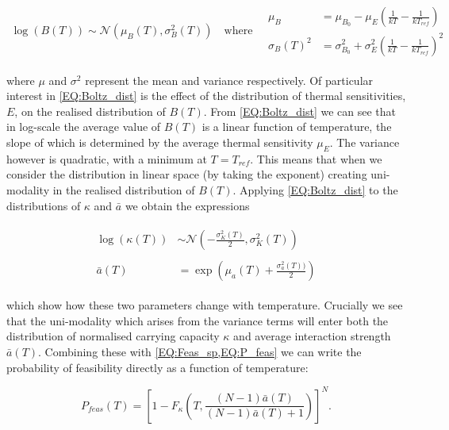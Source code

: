 \documentclass{article}
\begin{document}
\begin{align} \label{EQ:Boltz_dist}
    \log(B(T)) \sim \mathcal{N}\left(\mu_{B}(T) , \sigma_{B}^2(T) \right) 
    \quad \text{where} \quad
    \begin{array}{cc}
        \mu_B &= \mu_{B_0} - \mu_{E} \left(\frac{1}{kT} - \frac{1}{k T_{ref} }\right)  \\
        \sigma_{B}(T)^2 &= \sigma_{B_0}^2 + \sigma_{E}^2 \left(\frac{1}{kT} - \frac{1}{k T_{ref} }\right)^2
    \end{array}
\end{align}

where $\mu$ and $\sigma^2$ represent the mean and variance respectively. Of particular interest in \cref{EQ:Boltz_dist} is the effect of the distribution of thermal sensitivities, $E$, on the realised distribution of $B(T)$. From \cref{EQ:Boltz_dist} we can see that in log-scale the average value of $B(T)$ is a linear function of temperature, the slope of which is determined by the average thermal sensitivity $\mu_E$. The variance however is quadratic, with a minimum at $T = T_{ref}$. This means that when we consider the distribution in linear space (by taking the exponent)  creating uni-modality in the realised distribution of $B(T)$. Applying \cref{EQ:Boltz_dist} to the distributions of $\kappa$ and $\bar{a}$ we obtain the expressions

\begin{align} \label{EQ:Trait_distributions}
    \begin{array}{cc}
        \log(\kappa(T)) &\sim \mathcal{N}\left( -\frac{\sigma_{K}^2(T)}{2} , \sigma_{K}^2(T) \right) \\ \\
        \bar{a}(T) &= \exp \left(\mu_a(T) + \frac{\sigma_a^2(T))}{2} \right)
    \end{array}
\end{align}

which show how these two parameters change with temperature. Crucially we see that the uni-modality which arises from the variance terms will enter both the distribution of normalised carrying capacity $\kappa$ and average interaction strength $\bar{a}(T)$. Combining these with \cref{EQ:Feas_sp,EQ:P_feas} we can write the probability of feasibility directly as a function of temperature:

\begin{equation} \label{EQ:P_feas_Temp}
    P_{feas}(T) = \left[1 - F_{\kappa}\left(T , \frac{(N-1)\bar{a}(T)}{(N-1)\bar{a}(T) + 1} \right) \right]^N.
\end{equation}
\end{document}
